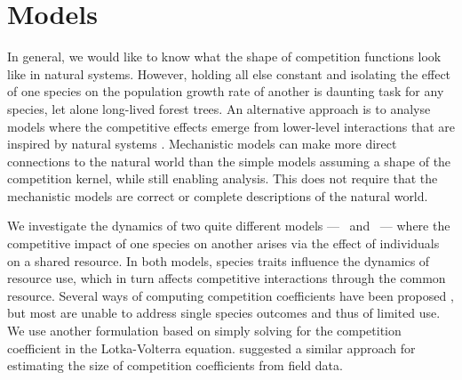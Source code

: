 \documentclass[a4paper,11pt]{article}
\begin{document}
\section{Models}

In general, we would like to know what the shape of competition
functions look like in natural systems.  However, holding all else
constant and isolating the effect of one species on the population
growth rate of another is daunting task for any species, let alone
long-lived forest trees.
%
An alternative approach is to analyse models where the competitive
effects emerge from lower-level interactions that are inspired by
natural systems \citep[e.g.,][]{Draghi-2012}.
Mechanistic models can make more direct connections to the natural
world than the simple models assuming a shape of the competition
kernel, while still enabling analysis.  This does not require that the
mechanistic models are correct or complete descriptions of the natural
world.

We investigate the dynamics of two quite different models --- \Rstar\
and \plant\ --- where the competitive impact of one species on another
arises via the effect of individuals on a shared resource.
%
In both models, species traits influence the dynamics of resource use,
which in turn affects competitive interactions through the common
resource.
Several ways of computing competition coefficients have been
proposed \citep[e.g.,][]{Abrams-1987,Abrams-2008}, but most are unable
to address single species outcomes and thus of limited use.
%
We use another formulation based on simply solving for the competition
coefficient in the Lotka-Volterra equation. \citet{Ricklefs-1973}
suggested a similar approach for estimating the size of competition
coefficients from field data.
\end{document}
